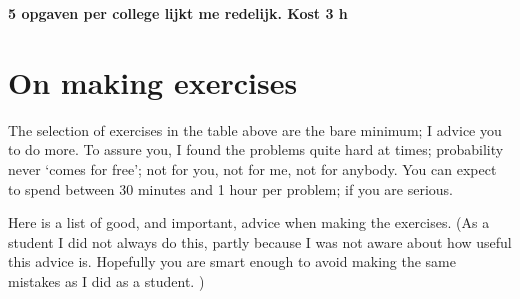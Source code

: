 \documentclass[a4paper]{article}
\theoremstyle{definition}
\newcommand{\1}[1]{\,I_{#1}} %
\newcommand{\nvf}[1]{\textbf{#1}}
\begin{document}
\nvf{5 opgaven per college lijkt me redelijk. Kost 3 h}

\section{On making exercises}
\label{sec:org2c04edf}

The selection of exercises in the table above are the bare minimum; I advice you to do more.
To assure you, I found the problems quite hard at times; probability never `comes for free'; not for you, not for me, not for anybody.
You can expect to spend between 30 minutes and 1 hour per problem; if you are serious.



Here is a list of good, and important, advice when making the exercises.
(As a student I did not always do this, partly because I was not aware about how useful this advice is. Hopefully you are smart enough to avoid making the same mistakes as I did as a student.
)
\end{document}
